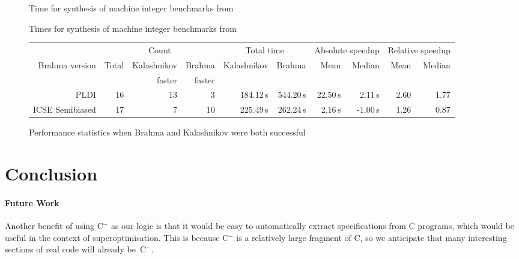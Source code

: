 \documentclass[a4paper]{llncs}
\newcommand{\newC}{C$^-$\xspace}
\begin{document}
\begin{figure}
\begin{center}
{\tiny

}
\end{center}
\caption{Time for synthesis of machine integer benchmarks from~\cite{brahma}
 \label{fig:results-table}}
\end{figure}

\begin{figure}
\begin{center}
{\tiny

}
\end{center}
\caption{Times for synthesis of machine integer benchmarks from~\cite{brahma-icse}}
\label{fig:icse-results-table}
\end{figure}



\begin{figure}

{\tiny
\begin{center}
 \begin{tabular}{r||r|r|r|r|r|r|r|r|r}
  & \multicolumn{3}{c}{Count} & \multicolumn{2}{|c}{Total time} & \multicolumn{2}{|c}{Absolute speedup} & \multicolumn{2}{|c}{Relative speedup} \\
  {\sc Brahma} version & Total & {\sc Kalashnikov} & {\sc Brahma} & {\sc Kalashnikov} & {\sc Brahma} & Mean & Median & Mean & Median \\
  &       & faster            & faster       &                   &              &      &        &      & \\
  \hline
  \hline
  PLDI & 16 & 13 & 3 & 184.12\,s & 544.20\,s & 22.50\,s & 2.11\,s & 2.60 & 1.77 \\
  ICSE Semibiased & 17 & 7 & 10 & 225.49\,s & 262.24\,s & 2.16\,s & -1.00\,s & 1.26 & 0.87
 \end{tabular}
\end{center}
}

 \caption{Performance statistics when {\sc Brahma} and {\sc Kalashnikov} were both successful
 \label{fig:stats-table}}
\end{figure}



\section{Conclusion}

\paragraph{Future Work}
Another benefit of using \newC as our logic is that it would be easy to
automatically extract specifications from C programs, which would be
useful in the context of superoptimisation.  This is because \newC is
a relatively large fragment of C, so we anticipate that many interesting
sections of real code will already be~\newC.


{}

\end{document}
